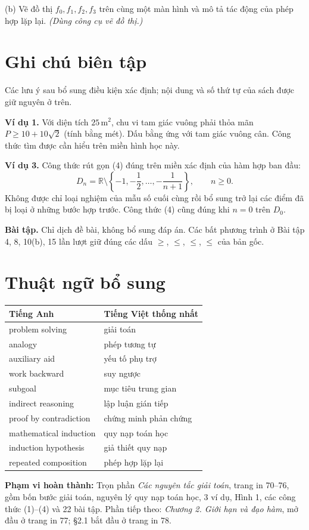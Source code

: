 \documentclass[12pt,a4paper]{article}
\begin{document}
(b) Vẽ đồ thị $f_0,f_1,f_2,f_3$ trên cùng một màn hình và mô tả tác động của phép hợp lặp lại. \textit{(Dùng công cụ vẽ đồ thị.)}
\section*{Ghi chú biên tập}
Các lưu ý sau bổ sung điều kiện xác định; nội dung và số thứ tự của sách được giữ nguyên ở trên.

\noindent\textbf{Ví dụ 1.} Với diện tích $25\,\mathrm{m}^2$, chu vi tam giác vuông phải thỏa mãn $P\ge10+10\sqrt2$ (tính bằng mét). Dấu bằng ứng với tam giác vuông cân. Công thức tìm được cần hiểu trên miền hình học này.

\noindent\textbf{Ví dụ 3.} Công thức rút gọn (4) đúng trên miền xác định của hàm hợp ban đầu:
\[D_n=\mathbb R\setminus\left\{-1,-\frac12,\ldots,-\frac1{n+1}\right\},\qquad n\ge0.\]
Không được chỉ loại nghiệm của mẫu số cuối cùng rồi bổ sung trở lại các điểm đã bị loại ở những bước hợp trước. Công thức (4) cũng đúng khi $n=0$ trên $D_0$.

\noindent\textbf{Bài tập.} Chỉ dịch đề bài, không bổ sung đáp án. Các bất phương trình ở Bài tập 4, 8, 10(b), 15 lần lượt giữ đúng các dấu $\ge$, $\le$, $\le$, $\le$ của bản gốc.
\section*{Thuật ngữ bổ sung}
\begin{center}\begin{tabular}{ll}\toprule Tiếng Anh&Tiếng Việt thống nhất\\\midrule
problem solving&giải toán\\
analogy&phép tương tự\\
auxiliary aid&yếu tố phụ trợ\\
work backward&suy ngược\\
subgoal&mục tiêu trung gian\\
indirect reasoning&lập luận gián tiếp\\
proof by contradiction&chứng minh phản chứng\\
mathematical induction&quy nạp toán học\\
induction hypothesis&giả thiết quy nạp\\
repeated composition&phép hợp lặp lại\\
\bottomrule\end{tabular}\end{center}
\noindent\textbf{Phạm vi hoàn thành:} Trọn phần \textit{Các nguyên tắc giải toán}, trang in 70–76, gồm bốn bước giải toán, nguyên lý quy nạp toán học, 3 ví dụ, Hình 1, các công thức (1)–(4) và 22 bài tập. Phần tiếp theo: \textit{Chương 2. Giới hạn và đạo hàm}, mở đầu ở trang in 77; §2.1 bắt đầu ở trang in 78.
\end{document}
